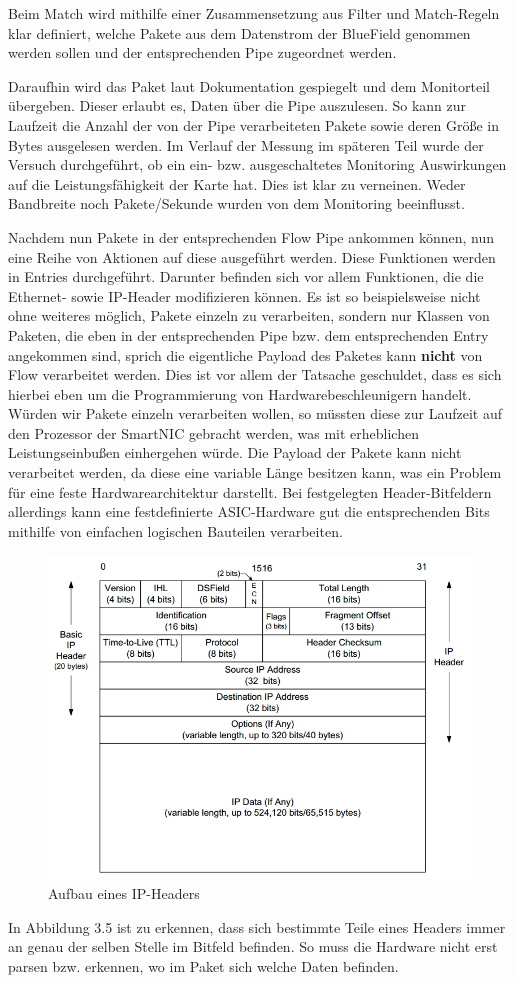 Beim Match wird mithilfe einer Zusammensetzung aus Filter und Match-Regeln klar definiert, welche Pakete aus dem Datenstrom der BlueField genommen werden sollen und der entsprechenden Pipe zugeordnet werden. 

Daraufhin wird das Paket laut Dokumentation gespiegelt und dem Monitorteil übergeben. Dieser erlaubt es, Daten über die Pipe auszulesen. So kann zur Laufzeit die Anzahl der von der Pipe verarbeiteten Pakete sowie deren Größe in Bytes ausgelesen werden. Im Verlauf der Messung im späteren Teil wurde der Versuch durchgeführt, ob ein ein- bzw. ausgeschaltetes Monitoring Auswirkungen auf die Leistungsfähigkeit der Karte hat. Dies ist klar zu verneinen. Weder Bandbreite noch Pakete/Sekunde wurden von dem Monitoring beeinflusst.

Nachdem nun Pakete in der entsprechenden Flow Pipe ankommen können, nun eine Reihe von Aktionen auf diese ausgeführt werden. Diese Funktionen werden in Entries durchgeführt. Darunter befinden sich vor allem Funktionen, die die Ethernet- sowie IP-Header modifizieren können. Es ist so beispielsweise nicht ohne weiteres möglich, Pakete einzeln zu verarbeiten, sondern nur Klassen von Paketen, die eben in der entsprechenden Pipe bzw. dem entsprechenden Entry angekommen sind, sprich die eigentliche Payload des Paketes kann \textbf{nicht} von Flow verarbeitet werden. Dies ist vor allem der Tatsache geschuldet, dass es sich hierbei eben um die Programmierung von Hardwarebeschleunigern handelt. Würden wir Pakete einzeln verarbeiten wollen, so müssten diese zur Laufzeit auf den Prozessor der SmartNIC gebracht werden, was mit erheblichen Leistungseinbußen einhergehen würde.
Die Payload der Pakete kann nicht verarbeitet werden, da diese eine variable Länge besitzen kann, was ein Problem für eine feste Hardwarearchitektur darstellt. Bei festgelegten Header-Bitfeldern allerdings kann eine festdefinierte ASIC-Hardware gut die entsprechenden Bits mithilfe von einfachen logischen Bauteilen verarbeiten. 
\begin{figure}
    \centering
    \includegraphics[width=0.8\linewidth]{images/figure_5-1.png}
    \caption{Aufbau eines IP-Headers}
    \label{fig:enter-label}
\end{figure}
In Abbildung 3.5 ist zu erkennen, dass sich bestimmte Teile eines Headers immer an genau der selben Stelle im Bitfeld befinden. So muss die Hardware nicht erst parsen bzw. erkennen, wo im Paket sich welche Daten befinden.

